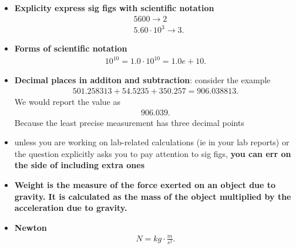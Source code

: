 \documentclass{report}
\begin{document}
\begin{itemize}
        \item \textbf{Explicity express sig figs with scientific notation}
            \begin{align*}
                &5600 \rightarrow 2 \\
                &5.60 \cdot 10^{3} \rightarrow 3
            .\end{align*}
        \item \textbf{Forms of scientific notation} 
            \begin{align*}
                10^{10} = 1.0 \cdot 10^{10} = 1.0e+10
            .\end{align*}
        \item \textbf{Decimal places in additon and subtraction}: consider the example
            \begin{align*}
                501.258313 + 54.5235 + 350.257 = 906.038813
            .\end{align*}
            We would report the value as 
            \begin{align*}
                906.039
            .\end{align*}
            Because the least precise measurement has three decimal points
        \item unless you are working on lab-related calculations (ie in your lab reports) or the question explicitly asks you to pay attention to sig figs, \textbf{you can err on the side of including extra ones}
        \item \textbf{Weight is the measure of the force exerted on an object due to gravity. It is calculated as the mass of the object multiplied by the acceleration due to gravity.}
        \item \textbf{Newton}
            \begin{align*}
                N = kg \cdot \frac{m}{s^{2}}
            .\end{align*}
    \end{itemize}

    \pagebreak 
\end{document}
